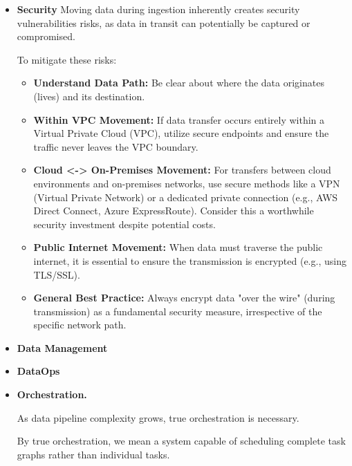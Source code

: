 \begin{itemize}
    \item \textbf{Security}
    Moving data during ingestion inherently creates security
    vulnerabilities risks, as data in transit can potentially be captured
    or compromised.
    
    To mitigate these risks:
    \begin{itemize}
        \item \textbf{Understand Data Path:} Be clear about where
        the data originates (lives) and its destination.
    
        \item \textbf{Within VPC Movement:} If data transfer occurs
        entirely within a Virtual Private Cloud (VPC), utilize
        secure endpoints and ensure the traffic never leaves the VPC
        boundary.
    
        \item \textbf{Cloud <-> On-Premises Movement:} For transfers
        between cloud environments and on-premises networks, use
        secure methods like a VPN (Virtual Private Network) or a
        dedicated private connection (e.g., AWS Direct Connect,
        Azure ExpressRoute). Consider this a worthwhile security
        investment despite potential costs.
    
        \item \textbf{Public Internet Movement:} When data must
        traverse the public internet, it is essential to ensure
        the transmission is encrypted (e.g., using TLS/SSL).
    
        \item \textbf{General Best Practice:} Always encrypt data
        "over the wire" (during transmission) as a fundamental
        security measure, irrespective of the specific network path.
    \end{itemize}

    \item \textbf{Data Management}
    


    \item \textbf{DataOps}
    


    \item \textbf{Orchestration.}
    
    \noindent
    As data pipeline complexity grows, true orchestration is
    necessary.
    
    By true orchestration, we mean a system capable of scheduling
    complete task graphs rather than individual tasks.
    

\end{itemize}
